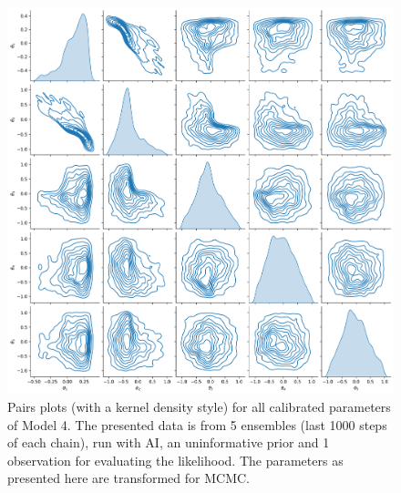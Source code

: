 \begin{figure}[ht]
\centering
\includegraphics[width=1.0\linewidth]{Figures/appendix_figs/kde_model4_Stretch.png}
\caption{Pairs plots (with a kernel density style) for all calibrated parameters of Model 4. The presented data is from 5 ensembles (last 1000 steps of each chain), run with AI, an uninformative prior and 1 observation for evaluating the likelihood. The parameters as presented here are transformed for MCMC.}\label{fig_kde_model4_AI}
\end{figure}